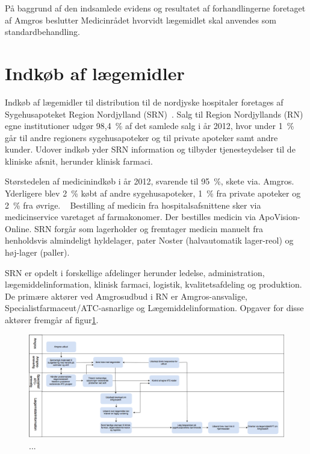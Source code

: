 På baggrund af den indsamlede evidens og resultatet af forhandlingerne foretaget af Amgros beslutter Medicinrådet hvorvidt lægemidlet skal anvendes som standardbehandling.~\citep{Amgros2017a} 

\section{Indkøb af lægemidler}
Indkøb af lægemidler til distribution til de nordjyske hospitaler foretages af Sygehusapoteket Region Nordjylland (SRN)~\citep{SygehusapoteketRegionNordjylland2013}. Salg til Region Nordjyllands (RN) egne institutioner udgør 98,4~\% af det samlede salg i år 2012, hvor under 1~\% går til andre regioners sygehusapoteker og til private apoteker samt andre kunder. Udover indkøb yder SRN information og tilbyder tjenesteydelser til de kliniske afsnit, herunder klinisk farmaci.~\citep{SygehusapoteketRegionNordjylland2013}

Størstedelen af medicinindkøb i år 2012, svarende til 95~\%, skete via. Amgros. Yderligere blev 2~\% købt af andre sygehusapoteker, 1~\% fra private apoteker og 2~\% fra øvrige. ~\citep{SygehusapoteketRegionNordjylland2013}
Bestilling af medicin fra hospitalsafsnittene sker via medicinservice varetaget af farmakonomer. Der bestilles medicin via ApoVision-Online. SRN forgår som lagerholder og fremtager medicin manuelt fra henholdsvis almindeligt hyldelager, pater Noster (halvautomatik lager-reol) og høj-lager (paller).~\citep{SygehusapoteketRegionNordjylland2013}

SRN er opdelt i forskellige afdelinger herunder ledelse, administration, lægemiddelinformation, klinisk farmaci, logistik, kvalitetsafdeling og produktion. De primære aktører ved Amgrosudbud i RN er Amgros-ansvalige, Specialistfarmaceut/ATC-asnarlige og Lægemiddelinformation. Opgaver for disse aktører fremgår af figur\ref{fig:SRNudbud}.

\begin{figure}[H]\centering
	\includegraphics[width=1\textwidth]{billeder/SRNudbud.png} 
	\caption{...}
	\label{fig:SRNudbud}  
\end{figure}

